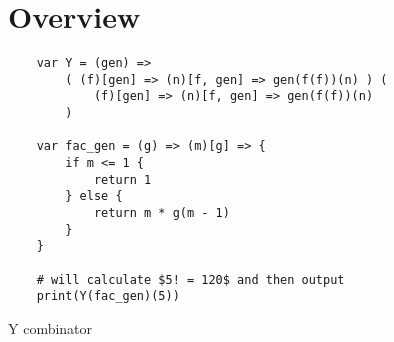 \newpage

\section{Overview}

\begin{listing}[!h]
    \begin{verbatim}
    var Y = (gen) => 
        ( (f)[gen] => (n)[f, gen] => gen(f(f))(n) ) (
            (f)[gen] => (n)[f, gen] => gen(f(f))(n)
        )
    
    var fac_gen = (g) => (m)[g] => {
        if m <= 1 {
            return 1
        } else {
            return m * g(m - 1)
        }
    }
    
    # will calculate $5! = 120$ and then output
    print(Y(fac_gen)(5))
    \end{verbatim}
    \caption{Y combinator}
\end{listing}
